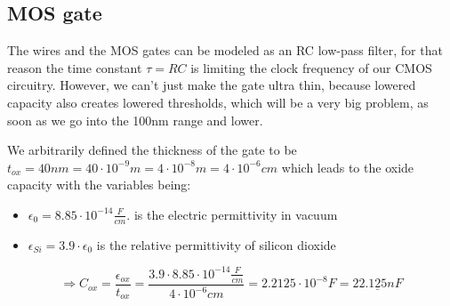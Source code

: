 \subsection{MOS gate}
The wires and the MOS gates can be modeled as an RC low-pass filter, for that reason the time constant $\tau=RC$ is limiting the clock frequency of our CMOS circuitry.
However, we can't just make the gate ultra thin, because lowered capacity also creates lowered thresholds, which will be a very big problem, as soon as we go into the 100nm range and lower.

We arbitrarily defined the thickness of the gate to be $t_{ox}=40 nm=40 \cdot 10^{-9}m=4 \cdot 10^{-8}m=4 \cdot 10^{-6}cm$ which leads to the oxide capacity with the variables being:
\begin{itemize}
\item $\epsilon_0 = 8.85 \cdot 10^{−14}\frac{F}{cm}. $ is the electric permittivity in vacuum
\item $\epsilon_{Si} =3.9 \cdot \epsilon_0$ is the relative permittivity of silicon dioxide
\end{itemize}
\begin{equation}
\Rightarrow
C_{ox}
=
\frac{\epsilon_{ox}}{t_{ox}}
=
\frac{3.9 \cdot 8.85 \cdot 10^{−14} \frac{F}{cm}}{4 \cdot 10^{-6}cm}
=
2.2125 \cdot 10^{-8} F
=
\underline{22.125 nF}
\end{equation}

